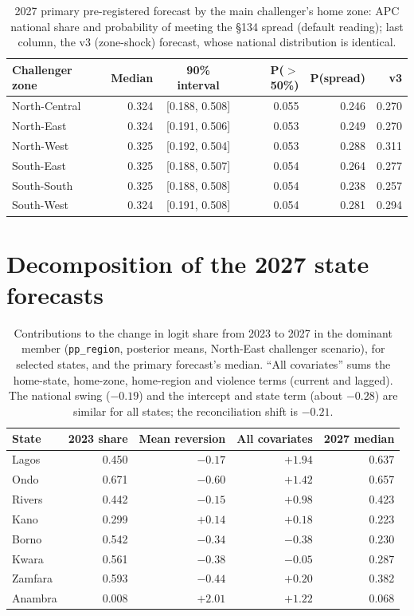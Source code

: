 \documentclass[preprint,12pt,authoryear]{elsarticle}
\begin{document}
\begin{table}[ht]
\centering
\setlength{\tabcolsep}{4pt}
\caption{2027 primary pre-registered forecast by the main challenger's home zone: APC national share and probability of meeting the \S134 spread (default reading); last column, the v3 (zone-shock) forecast, whose national distribution is identical.}
\label{tab:2027_scenarios}
\small
\begin{tabular}{lrcrrr}
\toprule
Challenger zone & Median & 90\% interval & P($>$50\%) & P(spread) & v3 \\
\midrule
North-Central & 0.324 & [0.188, 0.508] & 0.055 & 0.246 & 0.270 \\
North-East & 0.324 & [0.191, 0.506] & 0.053 & 0.249 & 0.270 \\
North-West & 0.325 & [0.192, 0.504] & 0.053 & 0.288 & 0.311 \\
South-East & 0.325 & [0.188, 0.507] & 0.054 & 0.264 & 0.277 \\
South-South & 0.325 & [0.188, 0.508] & 0.054 & 0.238 & 0.257 \\
South-West & 0.324 & [0.191, 0.508] & 0.054 & 0.281 & 0.294 \\
\bottomrule
\end{tabular}
\end{table}

\section{Decomposition of the 2027 state forecasts}
\label{app:decomp}

\begin{table}[ht]
\centering
\caption{Contributions to the change in logit share from 2023 to 2027 in the dominant member (\texttt{pp\_region}, posterior means, North-East challenger scenario), for selected states, and the primary forecast's median. ``All covariates'' sums the home-state, home-zone, home-region and violence terms (current and lagged). The national swing ($-0.19$) and the intercept and state term (about $-0.28$) are similar for all states; the reconciliation shift is $-0.21$.}
\label{tab:decomp}
\small
\begin{tabular}{lrrrr}
\toprule
State & 2023 share & Mean reversion & All covariates & 2027 median \\
\midrule
Lagos & 0.450 & $-0.17$ & $+1.94$ & 0.637 \\
Ondo & 0.671 & $-0.60$ & $+1.42$ & 0.657 \\
Rivers & 0.442 & $-0.15$ & $+0.98$ & 0.423 \\
Kano & 0.299 & $+0.14$ & $+0.18$ & 0.223 \\
Borno & 0.542 & $-0.34$ & $-0.38$ & 0.230 \\
Kwara & 0.561 & $-0.38$ & $-0.05$ & 0.287 \\
Zamfara & 0.593 & $-0.44$ & $+0.20$ & 0.382 \\
Anambra & 0.008 & $+2.01$ & $+1.22$ & 0.068 \\
\bottomrule
\end{tabular}
\end{table}
\end{document}
